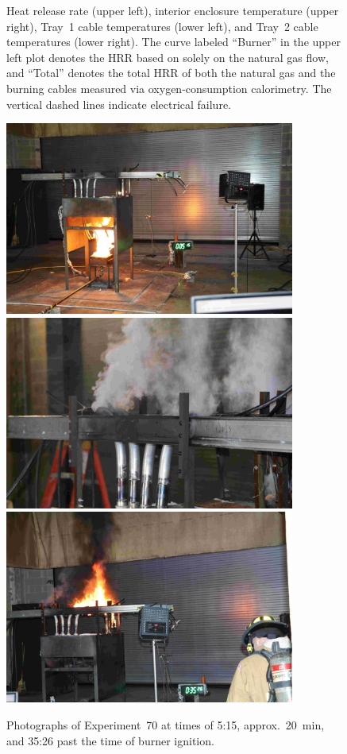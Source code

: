 \begin{figure}[H]
\caption[HRR and temperatures of Experiment 70]{Heat release rate (upper left), interior enclosure temperature (upper right), Tray~1 cable temperatures (lower left), and Tray~2 cable temperatures (lower right). The curve labeled ``Burner'' in the upper left plot denotes the HRR based on solely on the natural gas flow, and ``Total'' denotes the total HRR of both the natural gas and the burning cables measured via oxygen-consumption calorimetry. The vertical dashed lines indicate electrical failure.}
\label{fig:Test_70}
\end{figure}

\begin{figure}[p]
\centering
\includegraphics[height=2.50in]{../FIGURES/Test_70_Photo_1} \\ \vspace{0.1in}
\includegraphics[height=2.50in]{../FIGURES/Test_70_Photo_2} \\ \vspace{0.1in}
\includegraphics[height=2.50in]{../FIGURES/Test_70_Photo_3}
\caption[Photographs of Experiment~70]{Photographs of Experiment~70 at times of 5:15, approx.~20~min, and 35:26 past the time of burner ignition.}
\label{fig:Test_70_photos}
\end{figure}



